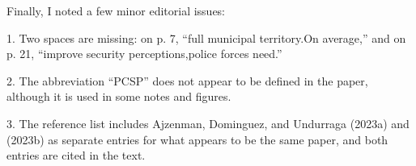 \begin{bibunit}
\begin{refcomment}
Finally, I noted a few minor editorial issues:

1. Two spaces are missing: on p. 7, ``full municipal territory.On average,'' and on p. 21, ``improve security perceptions,police forces need.''

\label{pt:r2_05}
\end{refcomment}

\begin{response}
    
\end{response}


\begin{refcomment}

2. The abbreviation ``PCSP'' does not appear to be defined in the paper, although it is used in some notes and figures.

\label{pt:r2_06}
\end{refcomment}

\begin{response}
    
\end{response}


\begin{refcomment}

3. The reference list includes Ajzenman, Dominguez, and Undurraga (2023a) and (2023b) as separate entries for what appears to be the same paper, and both entries are cited in the text.

\label{pt:r2_07}
\end{refcomment}

\begin{response}
    
\end{response}

\putbib
\end{bibunit}
